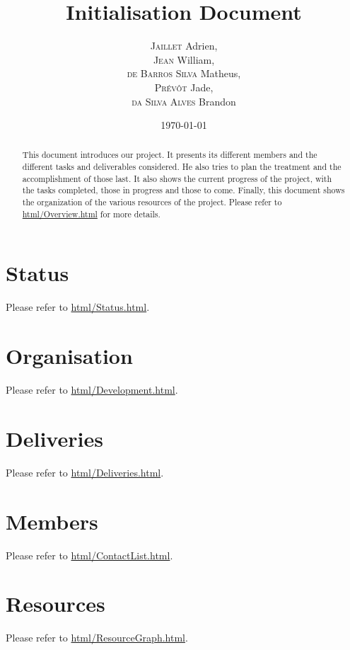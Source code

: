 \documentclass{article}
\title{Initialisation Document}
\author{\textsc{Jaillet} Adrien,\\
		\textsc{Jean} William,\\
		\textsc{de Barros Silva} Matheus,\\
		\textsc{Prévôt} Jade,\\
		\textsc{da Silva Alves} Brandon}
\date{\today}
\begin{document}
	\maketitle
	\begin{abstract}
		This document introduces our project. It presents its different members
		and the different tasks and deliverables considered. He also tries to
		plan the treatment and the accomplishment of those last. It also shows
		the current progress of the project, with the tasks completed, those in
		progress and those to come. Finally, this document shows the organization
		of the various resources of the project. Please refer to
		\url{html/Overview.html} for more details.
	\end{abstract}
	\section*{Status}
		Please refer to \url{html/Status.html}.
	\section*{Organisation}
		Please refer to \url{html/Development.html}.
	\section*{Deliveries}
		Please refer to \url{html/Deliveries.html}.
	\section*{Members}
		Please refer to \url{html/ContactList.html}.
	\section*{Resources}
		Please refer to \url{html/ResourceGraph.html}.
\end{document}
